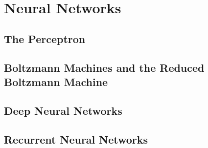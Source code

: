 \chapter{Neural Networks}
\label{appendix:neural}



\section{The Perceptron}
\label{appendix:neural:perceptron}



\section{Boltzmann Machines and the Reduced Boltzmann Machine}
\label{appendix:neural:boltzmann}



\section{Deep Neural Networks}
\label{appendix:neural:deep}



\section{Recurrent Neural Networks}
\label{appendix:neural:rnn}


